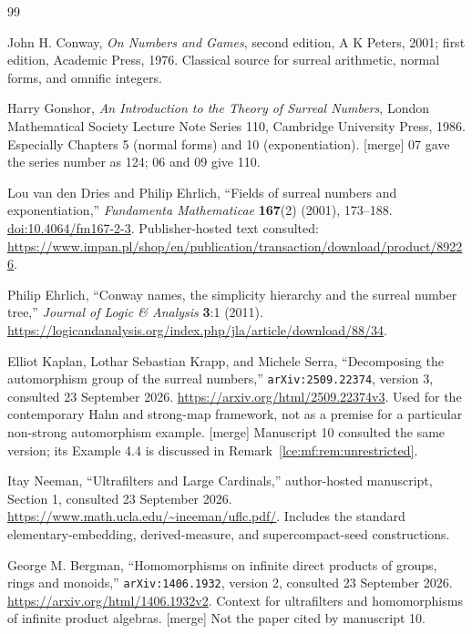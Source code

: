 \documentclass[11pt,letterpaper]{article}
\numberwithin{equation}{section}
\theoremstyle{definition}
\theoremstyle{remark}
\newcommand{\mergetag}{\textup{\textsf{\small[merge]}}}%
\begin{document}
\begingroup
\small
\raggedright
\begin{thebibliography}{99}
\setlength{\itemsep}{4pt}
\setlength{\parskip}{0pt}

John H. Conway,
\emph{On Numbers and Games}, second edition,
A K Peters, 2001; first edition, Academic Press, 1976.
Classical source for surreal arithmetic, normal forms, and omnific integers.

Harry Gonshor,
\emph{An Introduction to the Theory of Surreal Numbers},
London Mathematical Society Lecture Note Series 110,
Cambridge University Press, 1986.
Especially Chapters 5 (normal forms) and 10 (exponentiation).
\mergetag{} 07 gave the series number as 124; 06 and 09 give 110.

Lou van den Dries and Philip Ehrlich,
``Fields of surreal numbers and exponentiation,''
\emph{Fundamenta Mathematicae} \textbf{167}(2) (2001), 173--188.
\href{https://doi.org/10.4064/fm167-2-3}{doi:10.4064/fm167-2-3}.
Publisher-hosted text consulted:
\url{https://www.impan.pl/shop/en/publication/transaction/download/product/89226}.

Philip Ehrlich,
``Conway names, the simplicity hierarchy and the surreal number tree,''
\emph{Journal of Logic \& Analysis} \textbf{3}:1 (2011).
\url{https://logicandanalysis.org/index.php/jla/article/download/88/34}.

Elliot Kaplan, Lothar Sebastian Krapp, and Michele Serra,
``Decomposing the automorphism group of the surreal numbers,''
\texttt{arXiv:2509.22374}, version 3, consulted 23 September 2026.
\url{https://arxiv.org/html/2509.22374v3}.
Used for the contemporary Hahn and strong-map framework, not as a
premise for a particular non-strong automorphism example.
\mergetag{} Manuscript 10 consulted the same version; its Example 4.4 is
discussed in Remark~\ref{lce:mf:rem:unrestricted}.

Itay Neeman,
``Ultrafilters and Large Cardinals,'' author-hosted manuscript,
Section 1, consulted 23 September 2026.
\url{https://www.math.ucla.edu/~ineeman/uflc.pdf/}.
Includes the standard elementary-embedding, derived-measure, and
supercompact-seed constructions.

George M. Bergman,
``Homomorphisms on infinite direct products of groups, rings and monoids,''
\texttt{arXiv:1406.1932}, version 2, consulted 23 September 2026.
\url{https://arxiv.org/html/1406.1932v2}.
Context for ultrafilters and homomorphisms of infinite product algebras.
\mergetag{} Not the paper \cite{BergmanFamilies} cited by manuscript 10.


\end{thebibliography}
\end{document}
